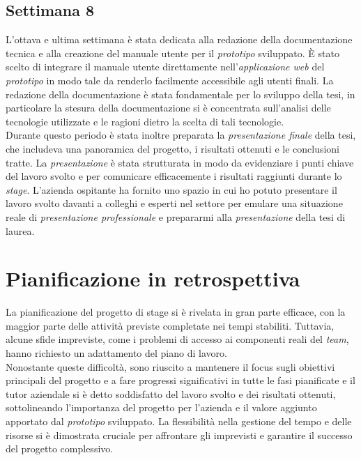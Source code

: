 \subsection{Settimana 8}
L'ottava e ultima settimana è stata dedicata alla redazione della documentazione tecnica e alla creazione del manuale utente per il \emph{prototipo} sviluppato. È stato scelto di integrare il manuale utente direttamente nell'\emph{applicazione web} del \emph{prototipo} in modo tale da renderlo facilmente accessibile agli utenti finali. La redazione della documentazione è stata fondamentale per lo sviluppo della tesi, in particolare la stesura della documentazione si è concentrata sull'analisi delle tecnologie utilizzate e le ragioni dietro la scelta di tali tecnologie.\\
Durante questo periodo è stata inoltre preparata la \emph{presentazione finale} della tesi, che includeva una panoramica del progetto, i risultati ottenuti e le conclusioni tratte. La \emph{presentazione} è stata strutturata in modo da evidenziare i punti chiave del lavoro svolto e per comunicare efficacemente i risultati raggiunti durante lo \emph{stage}. L'azienda ospitante ha fornito uno spazio in cui ho potuto presentare il lavoro svolto davanti a colleghi e esperti nel settore per emulare una situazione reale di \emph{presentazione professionale} e prepararmi alla \emph{presentazione} della tesi di laurea.

\section{Pianificazione in retrospettiva}
La pianificazione del progetto di stage si è rivelata in gran parte efficace, con la maggior parte delle attività previste completate nei tempi stabiliti. Tuttavia, alcune sfide impreviste, come i problemi di accesso ai componenti reali del \emph{team}, hanno richiesto un adattamento del piano di lavoro.
\\Nonostante queste difficoltà, sono riuscito a mantenere il focus sugli obiettivi principali del progetto e a fare progressi significativi in tutte le fasi pianificate e il tutor aziendale si è detto soddisfatto del lavoro svolto e dei risultati ottenuti, sottolineando l'importanza del progetto per l'azienda e il valore aggiunto apportato dal \emph{prototipo} sviluppato. La flessibilità nella gestione del tempo e delle risorse si è dimostrata cruciale per affrontare gli imprevisti e garantire il successo del progetto complessivo.
